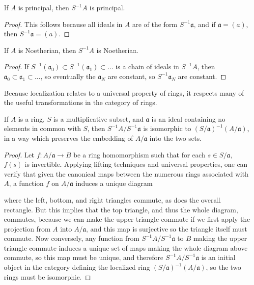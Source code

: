\begin{prop}
    If $A$ is principal, then $S^{-1}A$ is principal.
\end{prop}
\begin{proof}
    This follows because all ideals in $A$ are of the form $S^{-1} \mathfrak{a}$, and if $\mathfrak{a} = (a)$, then $S^{-1}\mathfrak{a} = (a)$.
\end{proof}

\begin{prop}
    If $A$ is Noetherian, then $S^{-1}A$ is Noetherian.
\end{prop}
\begin{proof}
    If $S^{-1}(\mathfrak{a}_0) \subset S^{-1}(\mathfrak{a}_1) \subset \dots$ is a chain of ideals in $S^{-1}A$, then $\mathfrak{a}_0 \subset \mathfrak{a}_1 \subset \dots$, so eventually the $\mathfrak{a}_N$ are constant, so $S^{-1}\mathfrak{a}_N$ are constant.
\end{proof}

Because localization relates to a universal property of rings, it respects many of the useful transformations in the category of rings.

\begin{prop}
    If $A$ is a ring, $S$ is a multiplicative subset, and $\mathfrak{a}$ is an ideal containing no elements in common with $S$, then $S^{-1}A/S^{-1}\mathfrak{a}$ is isomorphic to $(S/\mathfrak{a})^{-1}(A/\mathfrak{a})$, in a way which preserves the embedding of $A/\mathfrak{a}$ into the two sets.
\end{prop}
\begin{proof}
    Let $f: A/\mathfrak{a} \to B$ be a ring homomorphism such that for each $s \in S/\mathfrak{a}$, $f(s)$ is invertible. Applying lifting techniques and universal properties, one can verify that given the canonical maps between the numerous rings associated with $A$, a function $f$ on $A/\mathfrak{a}$ induces a unique diagram
    \begin{center}
    \end{center}
    where the left, bottom, and right triangles commute, as does the overall rectangle. But this implies that the top triangle, and thus the whole diagram, commutes, because we can make the upper triangle commute if we first apply the projection from $A$ into $A/\mathfrak{a}$, and this map is surjective so the triangle itself must commute. Now conversely, any function from $S^{-1}A/S^{-1}\mathfrak{a}$ to $B$ making the upper triangle commute induces a unique set of maps making the whole diagram above commute, so this map must be unique, and therefore $S^{-1}A/S^{-1}\mathfrak{a}$ is an initial object in the category defining the localized ring $(S/\mathfrak{a})^{-1}(A/\mathfrak{a})$, so the two rings must be isomorphic.
\end{proof}

